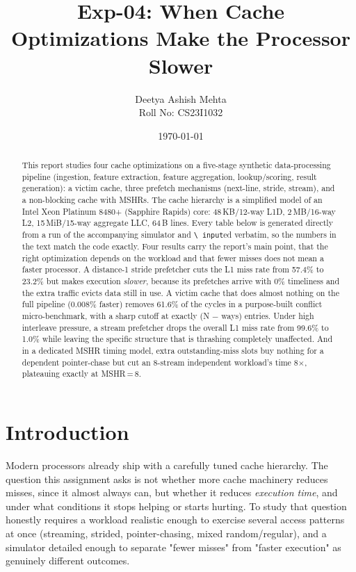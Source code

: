 \documentclass[11pt]{article}
\title{Exp-04: When Cache Optimizations Make the Processor Slower}
\author{Deetya Ashish Mehta \\ Roll No: CS23I1032}
\date{\today}
\begin{document}
\maketitle

\begin{abstract}
This report studies four cache optimizations on a five-stage synthetic
data-processing pipeline (ingestion, feature extraction, feature
aggregation, lookup/scoring, result generation): a victim cache, three
prefetch mechanisms (next-line, stride, stream), and a non-blocking cache
with MSHRs. The cache hierarchy is a simplified model of an Intel Xeon
Platinum 8480+ (Sapphire Rapids) core: 48\,KB/12-way L1D, 2\,MB/16-way L2,
15\,MiB/15-way aggregate LLC, 64\,B lines. Every table below is generated
directly from a run of the accompanying simulator and \texttt{\textbackslash
input}ed verbatim, so the numbers in the text match the code exactly. Four
results carry the report's main point, that the right optimization depends
on the workload and that fewer misses does not mean a faster processor.
A distance-1 stride prefetcher cuts the L1 miss rate from 57.4\% to 23.2\%
but makes execution \emph{slower}, because its prefetches arrive with 0\%
timeliness and the extra traffic evicts data still in use. A victim cache
that does almost nothing on the full pipeline (0.008\% faster) removes
61.6\% of the cycles in a purpose-built conflict micro-benchmark, with a
sharp cutoff at exactly (N $-$ ways) entries. Under high interleave
pressure, a stream prefetcher drops the overall L1 miss rate from 99.6\% to
1.0\% while leaving the specific structure that is thrashing completely
unaffected. And in a dedicated MSHR timing model, extra outstanding-miss
slots buy nothing for a dependent pointer-chase but cut an 8-stream
independent workload's time 8$\times$, plateauing exactly at MSHR\,=\,8.
\end{abstract}

\tableofcontents

\section{Introduction}

Modern processors already ship with a carefully tuned cache hierarchy. The
question this assignment asks is not whether more cache machinery reduces
misses, since it almost always can, but whether it reduces \emph{execution
time}, and under what conditions it stops helping or starts hurting. To
study that question honestly requires a workload realistic enough to
exercise several access patterns at once (streaming, strided, pointer-chasing,
mixed random/regular), and a simulator detailed enough to separate "fewer
misses" from "faster execution" as genuinely different outcomes.
\end{document}
